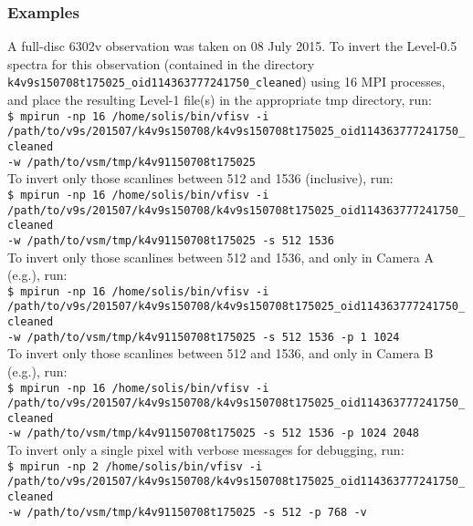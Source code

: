 \documentclass[11pt]{article}
\begin{document}
\subsubsection{Examples}
A full-disc 6302v observation was taken on 08 July 2015.  To invert the Level-0.5 spectra for this observation
(contained in the directory \texttt{k4v9s150708t175025\_oid114363777241750\_cleaned}) using 16 MPI processes, and
place the resulting Level-1 file(s) in the appropriate tmp directory, run:\\

\texttt{\$ mpirun -np 16 /home/solis/bin/vfisv -i \\
/path/to/v9s/201507/k4v9s150708/k4v9s150708t175025\_oid114363777241750\_cleaned\\
-w /path/to/vsm/tmp/k4v91150708t175025}\\

To invert only those scanlines between 512 and 1536 (inclusive), run:\\
\texttt{\$ mpirun -np 16 /home/solis/bin/vfisv -i \\
/path/to/v9s/201507/k4v9s150708/k4v9s150708t175025\_oid114363777241750\_cleaned\\
-w /path/to/vsm/tmp/k4v91150708t175025 -s 512 1536}\\

To invert only those scanlines between 512 and 1536, and only in Camera A (e.g.), run:\\
\texttt{\$ mpirun -np 16 /home/solis/bin/vfisv -i \\
/path/to/v9s/201507/k4v9s150708/k4v9s150708t175025\_oid114363777241750\_cleaned\\
-w /path/to/vsm/tmp/k4v91150708t175025 -s 512 1536 -p 1 1024}\\

To invert only those scanlines between 512 and 1536, and only in Camera B (e.g.), run:\\
\texttt{\$ mpirun -np 16 /home/solis/bin/vfisv -i \\
/path/to/v9s/201507/k4v9s150708/k4v9s150708t175025\_oid114363777241750\_cleaned\\
-w /path/to/vsm/tmp/k4v91150708t175025 -s 512 1536 -p 1024 2048}\\

To invert only a single pixel with verbose messages for debugging, run:\\
\texttt{\$ mpirun -np 2 /home/solis/bin/vfisv -i \\
/path/to/v9s/201507/k4v9s150708/k4v9s150708t175025\_oid114363777241750\_cleaned\\
-w /path/to/vsm/tmp/k4v91150708t175025 -s 512 -p 768 -v}\\
\end{document}
